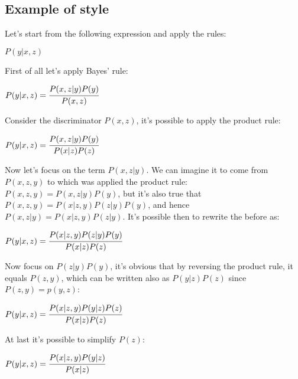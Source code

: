 \subsection{Example of style}
Let's start from the following expression and apply the rules:
\begin{center}
	$\displaystyle P(y\vert x,z)$
\end{center}
First of all let's apply Bayes' rule:
\begin{center}
	$\displaystyle P(y\vert x,z)=\cfrac{P(x,z\vert y)P(y)}{P(x,z)}$
\end{center}
Consider the discriminator $P(x,z)$, it's possible to apply the product rule:
\begin{center}
	$\displaystyle P(y\vert x,z)=\cfrac{P(x,z\vert y)P(y)}{P(x\vert z)P(z)}$
\end{center}
Now let's focus on the term $P(x,z\vert y)$. We can imagine it to come from $P(x,z,y)$ to which was applied the product rule: $P(x,z,y)=P(x,z\vert y)P(y)$, but it's also true that $P(x,z,y)=P(x\vert z,y)P(z\vert y)P(y)$, and hence $P(x,z\vert y)=P(x\vert z,y)P(z\vert y)$. It's possible then to rewrite the before as:
\begin{center}
	$\displaystyle P(y\vert x,z)=\cfrac{P(x\vert z,y)P(z\vert y)P(y)}{P(x\vert z)P(z)}$
\end{center}
Now focus on $P(z\vert y)P(y)$, it's obvious that by reversing the product rule, it equals $P(z,y)$, which can be written also as $P(y\vert z)P(z)$ since $P(z,y)=p(y,z)$:
\begin{center}
	$\displaystyle P(y\vert x,z)=\cfrac{P(x\vert z,y)P(y\vert z)P(z)}{P(x\vert z)P(z)}$
\end{center}
At last it's possible to simplify $P(z)$:
\begin{center}
	$\displaystyle P(y\vert x,z)=\cfrac{P(x\vert z,y)P(y\vert z)}{P(x\vert z)}$
\end{center}
%
%
%
